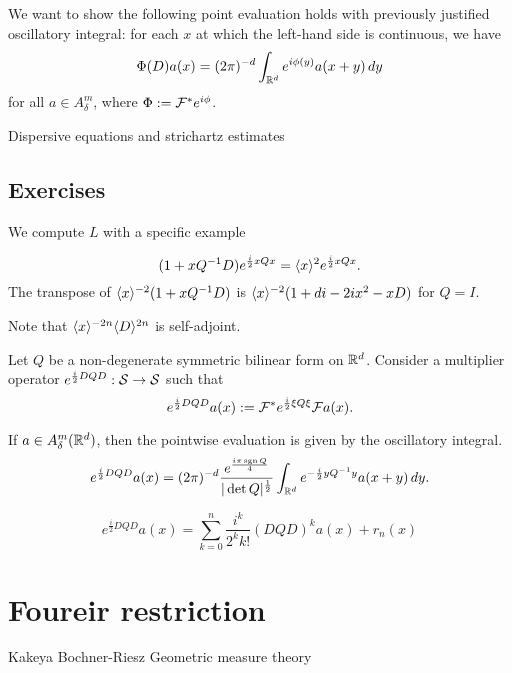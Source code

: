 \documentclass{../../large}
\begin{document}
\begin{prb}
We want to show the following point evaluation holds with previously justified oscillatory integral: for each $x$ at which the left-hand side is continuous, we have
\[\Phi(D)a(x)=(2\pi)^{-d}\int_{\mathbb{R}^d}e^{i\phi(y)}a(x+y)\,dy\]
for all $a\in A_\delta^m$, where $\Phi:=\mathcal{F}^*e^{i\phi}$.
\end{prb}



\begin{prb}

\end{prb}
\begin{pf}

\end{pf}



\begin{prb}
	
\end{prb}
Dispersive equations and strichartz estimates

\section*{Exercises}
\begin{prb}
We compute $L$ with a specific example
\end{prb}
\begin{pf}
\[(1+xQ^{-1}D)e^{\frac i2xQx}=\langle x\rangle^2e^{\frac i2xQx}.\]
The transpose of $\langle x\rangle^{-2}(1+xQ^{-1}D)$ is $\langle x\rangle^{-2}(1+di-2ix^2-xD)$ for $Q=I$.

Note that $\langle x\rangle^{-2n}\langle D\rangle^{2n}$ is self-adjoint.

Let $Q$ be a non-degenerate symmetric bilinear form on $\mathbb{R}^d$.
Consider a multiplier operator $e^{\frac i2DQD}:\mathcal{S}\to\mathcal{S}$ such that
\[e^{\frac i2DQD}a(x):=\mathcal{F}^*e^{\frac i2\xi Q\xi}\mathcal{F} a(x).\]
\begin{parts}
\item
If $a\in A_\delta^m(\mathbb{R}^d)$, then the pointwise evaluation is given by the oscillatory integral.
\[e^{\frac i2DQD}a(x)=(2\pi)^{-d}\frac{e^{\frac{i\pi\operatorname{sgn} Q}4}}{|\det Q|^{\frac12}}\int_{\mathbb{R}^d}e^{-\frac i2yQ^{-1}y}a(x+y)\,dy.\]
\item
\[e^{\frac i2DQD}a(x)=\sum_{k=0}^n\frac{i^k}{2^kk!}(DQD)^ka(x)+r_n(x)\]
\end{parts}
\end{pf}


\chapter{Foureir restriction}
Kakeya
Bochner-Riesz
Geometric measure theory
\end{document}
